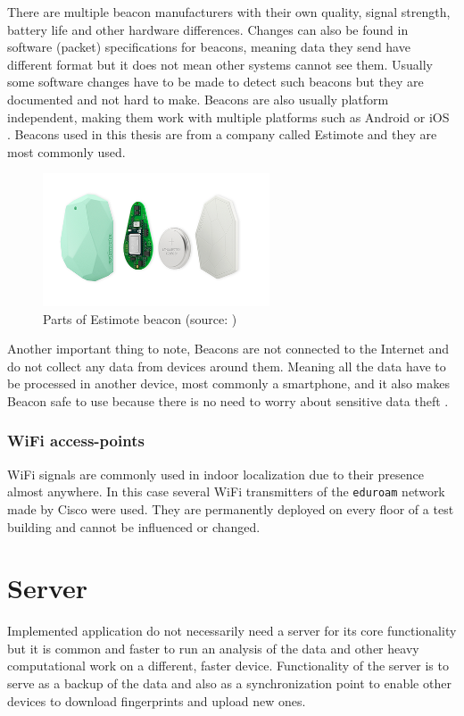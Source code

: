 There are multiple beacon manufacturers with their own quality, signal strength, battery life and other hardware differences. Changes can also be found in software (packet) specifications for beacons, meaning data they send have different format but it does not mean other systems cannot see them. Usually some software changes have to be made to detect such beacons but they are documented and not hard to make. Beacons are also usually platform independent, making them work with multiple platforms such as Android or iOS \cite{IPSBOBLE, 10TABB}. Beacons used in this thesis are from a company called Estimote and they are most commonly used.

\begin{figure}[H]
	\begin{centering}
		\includegraphics[width=0.6\textwidth]{img/estimote_beacon}
		\par\end{centering}
	\caption{Parts of Estimote beacon (source: \cite{RMPFEB})\label{fig:PartsOfEstimoteBeacon}}
	\label{fig02c05}
\end{figure}

Another important thing to note, Beacons are not connected to the Internet and do not collect any data from devices around them. Meaning all the data have to be processed in another device, most commonly a smartphone, and it also makes Beacon safe to use because there is no need to worry about sensitive data theft \cite{10TABB}.

\subsubsection{WiFi access-points}\label{subsec:WiFi access-points}
WiFi signals are commonly used in indoor localization due to their presence almost anywhere. In this case several WiFi transmitters of the \verb|eduroam| network made by Cisco were used. They are permanently deployed on every floor of a test building and cannot be influenced or changed.

\section{Server}\label{sec:Server}
Implemented application do not necessarily need a server for its core functionality but it is common and faster to run an analysis of the data and other heavy computational work on a different, faster device. Functionality of the server is to serve as a backup of the data and also as a synchronization point to enable other devices to download fingerprints and upload new ones.

